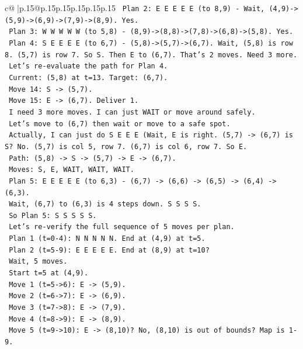 \documentclass{article}
\begin{document}
{\begin{supertabular}{c@{$\;$}|p{.15\linewidth}@{}p{.15\linewidth}p{.15\linewidth}p{.15\linewidth}p{.15\linewidth}p{.15\linewidth}}
{{{\texttt{   Plan 2: E E E E E (to 8,9) {-} Wait, (4,9){-}>(5,9){-}>(6,9){-}>(7,9){-}>(8,9). Yes.} \\
\texttt{   Plan 3: W W W W W (to 5,8) {-} (8,9){-}>(8,8){-}>(7,8){-}>(6,8){-}>(5,8). Yes.} \\
\texttt{   Plan 4: S E E E E (to 6,7) {-} (5,8){-}>(5,7){-}>(6,7). Wait, (5,8) is row 8. (5,7) is row 7. So S. Then E to (6,7). That's 2 moves. Need 3 more.} \\
\texttt{   Let's re{-}evaluate the path for Plan 4.} \\
\texttt{   Current: (5,8) at t=13. Target: (6,7).} \\
\texttt{   Move 14: S {-}> (5,7).} \\
\texttt{   Move 15: E {-}> (6,7). Deliver 1.} \\
\texttt{   I need 3 more moves. I can just WAIT or move around safely.} \\
\texttt{   Let's move to (6,7) then wait or move to a safe spot.} \\
\texttt{   Actually, I can just do S E E E (Wait, E is right. (5,7) {-}> (6,7) is S? No. (5,7) is col 5, row 7. (6,7) is col 6, row 7. So E.} \\
\texttt{   Path: (5,8) {-}> S {-}> (5,7) {-}> E {-}> (6,7).} \\
\texttt{   Moves: S, E, WAIT, WAIT, WAIT.} \\
\texttt{   Plan 5: E E E E E (to 6,3) {-} (6,7) {-}> (6,6) {-}> (6,5) {-}> (6,4) {-}> (6,3).} \\
\texttt{   Wait, (6,7) to (6,3) is 4 steps down. S S S S.} \\
\texttt{   So Plan 5: S S S S S.} \\
\texttt{   Let's re{-}verify the full sequence of 5 moves per plan.} \\
\texttt{   Plan 1 (t=0{-}4): N N N N N. End at (4,9) at t=5.} \\
\texttt{   Plan 2 (t=5{-}9): E E E E E. End at (8,9) at t=10?} \\
\texttt{   Wait, 5 moves.} \\
\texttt{   Start t=5 at (4,9).} \\
\texttt{   Move 1 (t=5{-}>6): E {-}> (5,9).} \\
\texttt{   Move 2 (t=6{-}>7): E {-}> (6,9).} \\
\texttt{   Move 3 (t=7{-}>8): E {-}> (7,9).} \\
\texttt{   Move 4 (t=8{-}>9): E {-}> (8,9).} \\
\texttt{   Move 5 (t=9{-}>10): E {-}> (8,10)? No, (8,10) is out of bounds? Map is 1{-}9.} \\
}}}
\end{supertabular}}
\end{document}
